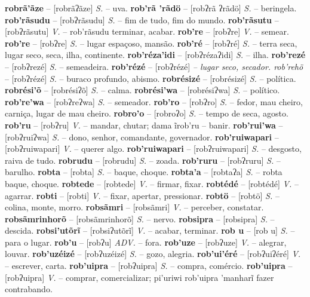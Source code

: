 \textbf{robrã'ãze} -- [robrãʔãze] \textit{S.} -- uva.
\textbf{rob'rã 'rãdö} -- [robʔrã ʔrãdö] \textit{S.} -- beringela.
\textbf{rob'rãsudu} -- [robʔrãsudu] \textit{S.} -- fim de tudo, fim do mundo.
\textbf{rob'rãsutu} -- [robʔrãsutu] \textit{V.} -- rob'rãsudu terminar, acabar.
\textbf{rob're} -- [robʔre] \textit{V.} -- semear.
\textbf{rob're} -- [robʔre] \textit{S.} -- lugar espaçoso, mansão.
\textbf{rob'ré} -- [robʔré] \textit{S.} -- terra seca, lugar seco, seca, ilha, continente.
\textbf{rob'réza'idi} -- [robʔrézaʔidi] \textit{S.} -- ilha.
\textbf{rob'rezé} -- [robʔrezé] \textit{S.} -- semeadeira.
\textbf{rob'rézé} -- [robʔrézé] \textit{-- lugar seco, secador. rob'rehö} -- [robʔrézé] \textit{S.} -- buraco profundo, abismo.
\textbf{robrésizé} -- [robrésizé] \textit{S.} -- política.
\textbf{robrési'õ} -- [robrésiʔõ] \textit{S.} -- calma.
\textbf{robrési'wa} -- [robrésiʔwa] \textit{S.} -- político.
\textbf{rob're'wa} -- [robʔreʔwa] \textit{S.} -- semeador.
\textbf{rob'ro} -- [robʔro] \textit{S.} -- fedor, mau cheiro, carniça, lugar de mau cheiro.
\textbf{robro'o} -- [robroʔo] \textit{S.} -- tempo de seca, agosto.
\textbf{rob'ru} -- [robʔru] \textit{V.} -- mandar, chutar; dama ĩrob'ru -- banir.
\textbf{rob'rui'wa} -- [robʔruiʔwa] \textit{S.} -- dono, senhor, comandante, governador.
\textbf{rob'ruiwapari} -- [robʔruiwapari] \textit{V.} -- querer algo.
\textbf{rob'ruiwapari} -- [robʔruiwapari] \textit{S.} -- desgosto, raiva de tudo.
\textbf{robrudu} -- [robrudu] \textit{S.} -- zoada.
\textbf{rob'ruru} -- [robʔruru] \textit{S.} -- barulho.
\textbf{robta} -- [robta] \textit{S.} -- baque, choque.
\textbf{robta'a} -- [robtaʔa] \textit{S.} -- robta baque, choque.
\textbf{robtede} -- [robtede] \textit{V.} -- firmar, fixar.
\textbf{robtédé} -- [robtédé] \textit{V.} -- agarrar.
\textbf{robti} -- [robti] \textit{V.} -- fixar, apertar, pressionar.
\textbf{robtö} -- [robtö] \textit{S.} -- colina, monte, morro.
\textbf{robsãmri} -- [robsãmri] \textit{V.} -- perceber, constatar.
\textbf{robsãmrinhorõ} -- [robsãmrinhorõ] \textit{S.} -- nervo.
\textbf{robsipra} -- [robsipra] \textit{S.} -- descida.
\textbf{robsi'utõrĩ} -- [robsiʔutõrĩ] \textit{V.} -- acabar, terminar.
\textbf{rob u} -- [rob u] \textit{S.} -- para o lugar.
\textbf{rob'u} -- [robʔu] \textit{ADV.} -- fora.
\textbf{rob'uze} -- [robʔuze] \textit{V.} -- alegrar, louvar.
\textbf{rob'uzéizé} -- [robʔuzéizé] \textit{S.} -- gozo, alegria.
\textbf{rob'ui'éré} -- [robʔuiʔéré] \textit{V.} -- escrever, carta.
\textbf{rob'uipra} -- [robʔuipra] \textit{S.} -- compra, comércio.
\textbf{rob'uipra} -- [robʔuipra] \textit{V.} -- comprar, comercializar; pi'uriwi rob'uipra 'manharĩ fazer contrabando.
